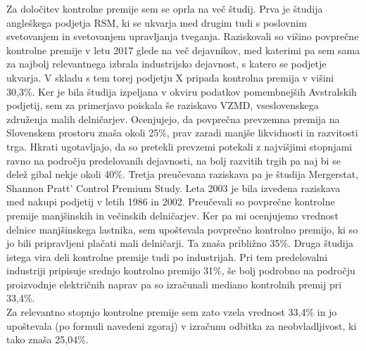 \documentclass[12pt,a4paper]{amsart}
\theoremstyle{definition} %
\theoremstyle{plain} %
\begin{document}
\begin{itemize}
Za določitev kontrolne premije sem se oprla na več študij. Prva je študija angleškega podjetja RSM, ki se ukvarja med drugim tudi s poslovnim svetovanjem in svetovanjem upravljanja tveganja. Raziskovali so višino povprečne kontrolne premije v letu 2017 glede na več dejavnikov, med katerimi pa sem sama za najbolj relevantnega izbrala industrijsko dejavnost, s katero se podjetje ukvarja. V skladu s tem torej podjetju X pripada kontrolna premija v višini 30,3\%. Ker je bila študija izpeljana v okviru podatkov pomembnejših Avstralskih podjetij, sem za primerjavo poiskala še raziskavo VZMD, vseslovenskega združenja malih delničarjev. Ocenjujejo, da povprečna prevzemna premija na Slovenskem prostoru znaša okoli 25\%, prav zaradi manjše likvidnosti in razvitosti trga. Hkrati ugotavljajo, da so pretekli prevzemi potekali z najvišjimi stopnjami ravno na področju predelovanih dejavnosti, na bolj razvitih trgih pa naj bi se delež gibal nekje okoli 40\%. Tretja preučevana raziskava pa je študija Mergerstat, Shannon Pratt' Control Premium Study. Leta 2003 je bila izvedena raziskava med nakupi podjetij v letih 1986 in 2002. Preučevali so povprečne kontrolne premije manjšinskih in večinskih delničarjev. Ker pa mi ocenjujemo vrednost delnice manjšinskega lastnika, sem upoštevala povprečno kontrolno premijo, ki so jo bili pripravljeni plačati mali delničarji. Ta znaša približno 35\%. Druga študija istega vira deli kontrolne premije tudi po industrijah. Pri tem predelovalni industriji pripisuje srednjo kontrolno premijo 31\%, še bolj podrobno na področju proizvodnje električnih naprav pa so izračunali mediano kontrolnih premij pri 33,4\%.\\
Za relevantno stopnjo kontrolne premije sem zato vzela vrednost 33,4\% in jo upoštevala (po formuli navedeni zgoraj) v izračunu odbitka za neobvladljivost, ki tako znaša 25,04\%.






\end{itemize}
\end{document}
